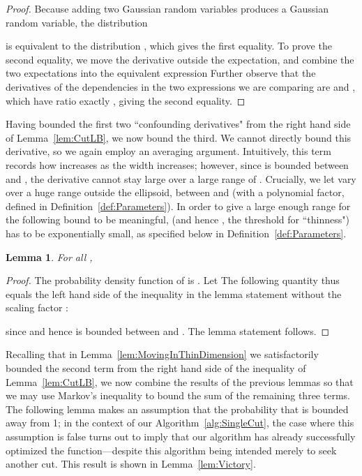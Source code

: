 \documentclass[11pt,letter]{article}
\newcounter{nTheorems}
\numberwithin{nTheorems}{section}
\newtheorem{lemma}[nTheorems]{Lemma}
\begin{document}
\begin{proof}
Because adding two Gaussian random variables produces a Gaussian random variable, the distribution

is equivalent to the distribution , which gives the first equality.
To prove the second equality, we move the derivative outside the expectation, and combine the two expectations into the equivalent expression 
Further observe that the derivatives of the  dependencies in the two expressions we are comparing are  and , which have ratio exactly , giving the second equality.
\end{proof}





Having bounded the first two ``confounding derivatives" from the right hand side of Lemma~\ref{lem:CutLB}, we now bound the third. We cannot directly bound this derivative, so we again employ an averaging argument. Intuitively, this term records how  increases as the width  increases; however, since  is bounded between  and , the derivative cannot stay large over a large range of . Crucially, we let  vary over a huge range outside the ellipsoid, between  and  (with  a polynomial factor, defined in Definition~\ref{def:Parameters}).
In order to give  a large enough range for the following bound to be meaningful,  (and hence , the threshold for ``thinness") has to be exponentially small, as specified below in Definition~\ref{def:Parameters}.
\begin{lemma}
\label{lem:SigmaTopExpectation}
For all ,

\end{lemma}

\begin{proof}
The probability density function of  is .
Let 
The following quantity thus equals the left hand side of the inequality in the lemma statement without the scaling factor :

since  and hence  is bounded between  and .
The lemma statement follows.
\end{proof}


Recalling that in Lemma~\ref{lem:MovingInThinDimension} we satisfactorily bounded the second term from the right hand side of the inequality of Lemma~\ref{lem:CutLB}, we now combine the results of the previous lemmas so that we may use Markov's inequality to bound the sum of the remaining three terms. The following lemma makes an assumption that the probability that  is bounded away from 1; in the context of our Algorithm~\ref{alg:SingleCut}, the case where this assumption is false turns out to imply that our algorithm has already successfully optimized the function---despite this algorithm being intended merely to seek another cut. This result is shown in Lemma~\ref{lem:Victory}.
\end{document}
